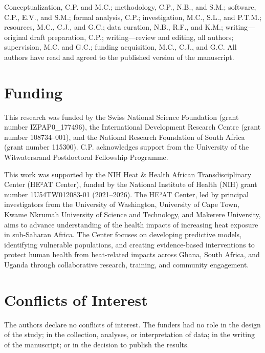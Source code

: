 \documentclass[11pt,a4paper]{article}
\begin{document}
Conceptualization, C.P. and M.C.; methodology, C.P., N.B., and S.M.; software, C.P., E.V., and S.M.; formal analysis, C.P.; investigation, M.C., S.L., and P.T.M.; resources, M.C., C.J., and G.C.; data curation, N.B., R.F., and K.M.; writing—original draft preparation, C.P.; writing—review and editing, all authors; supervision, M.C. and G.C.; funding acquisition, M.C., C.J., and G.C. All authors have read and agreed to the published version of the manuscript.

\section*{Funding}

This research was funded by the Swiss National Science Foundation (grant number IZPAP0\_177496), the International Development Research Centre (grant number 108734--001), and the National Research Foundation of South Africa (grant number 115300). C.P. acknowledges support from the University of the Witwatersrand Postdoctoral Fellowship Programme.

This work was supported by the NIH Heat \& Health African Transdisciplinary Center (HE²AT Center), funded by the National Institute of Health (NIH) grant number 1U54TW012083-01 (2021--2026). The HE²AT Center, led by principal investigators from the University of Washington, University of Cape Town, Kwame Nkrumah University of Science and Technology, and Makerere University, aims to advance understanding of the health impacts of increasing heat exposure in sub-Saharan Africa. The Center focuses on developing predictive models, identifying vulnerable populations, and creating evidence-based interventions to protect human health from heat-related impacts across Ghana, South Africa, and Uganda through collaborative research, training, and community engagement.

\section*{Conflicts of Interest}

The authors declare no conflicts of interest. The funders had no role in the design of the study; in the collection, analyses, or interpretation of data; in the writing of the manuscript; or in the decision to publish the results.
\end{document}
